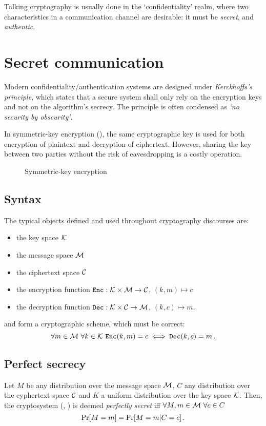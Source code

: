 Talking cryptography is usually done in the `confidentiality' realm, where two characteristics in a communication channel are desirable: it must be \emph{secret}, and \emph{authentic}.



\section{Secret communication}
Modern confidentiality/authentication systems are designed under \emph{Kerckhoffs's principle}, which states that a secure system shall only rely on the encryption keys and not on the algorithm's secrecy.
The principle is often condensed as \emph{`no security by obscurity'}.

In symmetric-key encryption (\ske), the same cryptographic key is used for both encryption of plaintext and decryption of ciphertext.
However, sharing the key between two parties without the risk of eavesdropping is a costly operation.

\begin{figure}[h]
	\centering
	
	\caption{Symmetric-key encryption}
\end{figure}


\subsection{Syntax}
The typical objects defined and used throughout cryptography discourses are:
%
\begin{itemize}[itemsep=1pt,parsep=0pt]
    \item the key space $\mathcal{K}$
    \item the message space $\mathcal{M}$
    \item the ciphertext space $\mathcal{C}$
    \item the encryption function $\texttt{Enc}: \mathcal{K} \times \mathcal{M} \to \mathcal{C}$, $(k, m) \mapsto c$
    \item the decryption function $\texttt{Dec}: \mathcal{K} \times \mathcal{C} \to \mathcal{M}$, $(k, c) \mapsto m$.
\end{itemize}
\Enc{} and \Dec{} form a cryptographic scheme, which must be correct:
\[
    \forall m \in \mathcal{M} \ \forall k \in \mathcal{K} \ \texttt{Enc}(k, m) = c \iff \texttt{Dec}(k, c) = m \, .
\]


\subsection{Perfect secrecy}
\begin{definition}\label{def:perfect-secrecy}
	Let $M$ be any distribution over the message space $\mathcal{M}$, $C$ any distribution over the cyphertext space $\mathcal{C}$ and $K$ a uniform distribution over the key space $\mathcal{K}$.
    Then, the cryptosystem (\Enc, \Dec) is deemed \emph{perfectly secret} iff $\forall M, m \in \mathcal{M} \ \forall c \in C$
%
    \begin{equation}\label{eq:perfect-secrecy-1}
    	 \Pr[M = m] = \Pr[M = m| C = c] \, .
    \end{equation}
\end{definition}

